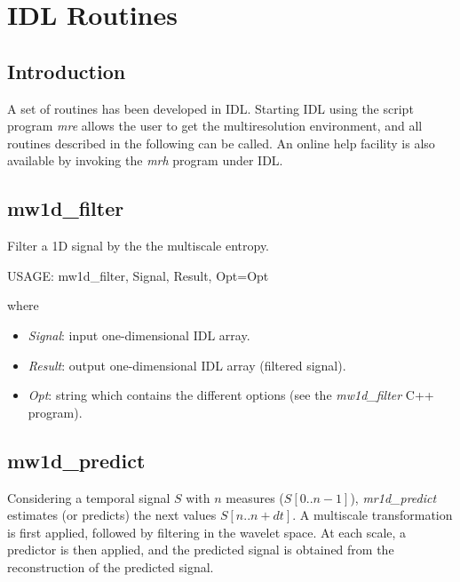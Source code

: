 
\section{IDL Routines}
\label{ch_mrs_idl}

\subsection{Introduction}
A set of routines has been developed in IDL. Starting IDL using
the script program {\em mre} allows the user to get the multiresolution
environment, and all routines
described in the following can be called. An online help facility 
is also available by
invoking the {\em mrh} program under IDL.

\subsection{mw1d\_filter}
Filter a 1D signal by the the multiscale entropy.
{\bf
\begin{center}
     USAGE: mw1d\_filter, Signal, Result, Opt=Opt
\end{center}}
where 
\begin{itemize}
\item {\em Signal}: input  one-dimensional IDL array.
\item {\em Result}: output one-dimensional IDL array (filtered signal).
\item {\em Opt}:  string which contains the different options 
(see the {\em mw1d\_filter} C++  program).
\end{itemize}

\subsection{mw1d\_predict}
Considering a temporal signal $S$ with $n$ measures ($S[0..n-1]$), 
 {\em mr1d\_predict} estimates (or predicts) the next values $S[n .. n+dt]$.
A multiscale transformation is first applied, followed by filtering
in the wavelet space. At each scale, a predictor is then applied,
and the predicted signal is obtained from the reconstruction of
the predicted signal. 

